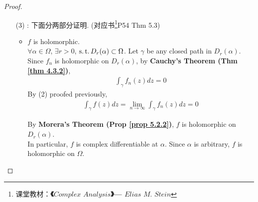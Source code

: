 \begin{thm}
\begin{proof}
\begin{enumerate}
				\vspace{2em}
				\item[(3)]: 下面分两部分证明. (对应书\footnote{课堂教材：\textbf{《$Complex \,\, Analysis$》---  $Elias \,\, M. \,\, Stein$}}P54 Thm 5.3)
				\begin{itemize}
					\item $f$ is holomorphic. \\
					$\forall \alpha \in \Omega$, $\exists r > 0$, $\operatorname{s.t.} D_{r}(\alpha) \subset \Omega$. Let $\gamma$ be any closed path in $D_{r}(\alpha)$.\\
					Since $f_n$ is holomorphic on $D_{r}(\alpha)$, by \textbf{Cauchy's Theorem (Thm \ref{thm 4.3.2})}, 
					\begin{align}
						\int_{\gamma}{f_{n}(z) dz} = 0
					\end{align}
					By (2) proofed previously, 
					\begin{align}
						\int_{\gamma}{f(z) dz} = \lim_{n \to \infty}{\int_{\gamma}{f_{n}(z) dz}} = 0
					\end{align}
				
					\newpage
					By \textbf{Morera's Theorem (Prop \ref{prop 5.2.2})}, $f$ is holomorphic on $D_{r}(\alpha)$.\\
					In particular, $f$ is complex differentiable at $\alpha$. Since $\alpha$ is arbitrary, $f$ is holomorphic on $\Omega$.
					
					\vspace{2em}
					

\end{itemize}
\end{enumerate}
\end{proof}
\end{thm}
